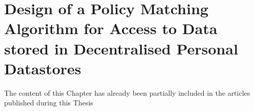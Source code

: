 \chapter{Design of a Policy Matching Algorithm for Access to Data stored in Decentralised Personal Datastores}
\label{chap:matching}

\begin{tcolorbox}[colback=royallavender!40]
The content of this Chapter has already been partially included in the articles published during this Thesis %
\end{tcolorbox}

% 
% 
% 
% 
% 

